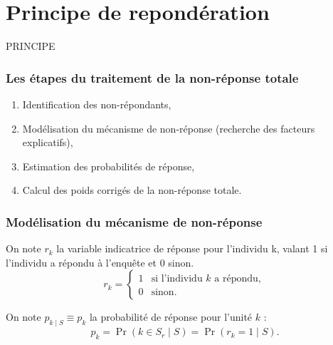 \section{Principe de repondération} %

\begin{frame}{}
	
	\huge \begin{center}
		PRINCIPE
	\end{center}
	
\end{frame}


\begin{frame}
	\frametitle{Les étapes du traitement de la non-réponse totale }
	

\vspace{0.5cm}
\begin{enumerate}
\item Identification des non-répondants,
\item Modélisation du mécanisme de non-réponse (recherche des facteurs explicatifs),
\item Estimation des probabilités de réponse,
\item Calcul des poids corrigés de la non-réponse totale.
\end{enumerate}

\end{frame}

\begin{frame}
	\frametitle{Modélisation du mécanisme de non-réponse}
	
On note $r_k$ la variable indicatrice de réponse pour l’individu k, valant
1 si l’individu a répondu à l’enquête et 0 sinon. \\ 

\[
r_k =
\begin{cases} 
	1 & \text{si l’individu $k$ a répondu}, \\
	0 & \text{sinon}.
\end{cases}
\]
\vspace{0.5cm}


On note $p_{k \mid S} \equiv p_k$ la probabilité de réponse pour l’unité $k$ : 
\[
p_k = \Pr(k \in S_r \mid S) = \Pr(r_k = 1 \mid S).
\]

\end{frame}


